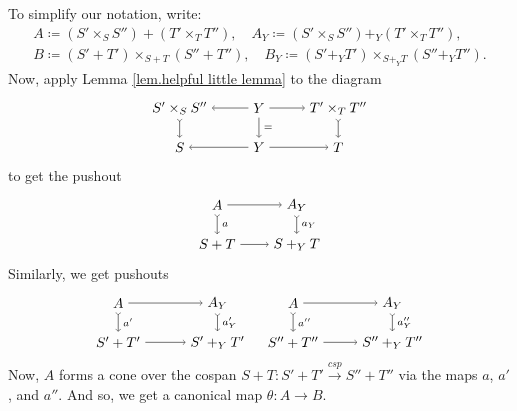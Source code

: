 \documentclass[11pt]{amsart}
\newcommand{\from}{\colon}
\newcommand{\cospan}{\xrightarrow{\mathit{csp}}}
\theoremstyle{remark}
\theoremstyle{definition}
\begin{document}
%
%
%
%
%

To simplify our notation, write:
%
\begin{gather*}
A \coloneqq (S' \times_SS'') + (T' \times_TT''), \quad 
A_Y \coloneqq (S' \times_SS'') +_Y (T' \times_TT''),\\
B \coloneqq (S'+T') \times_{S+T} (S''+T''),  \quad  
B_Y \coloneqq (S'+_YT') \times_{S+_YT} (S''+_YT''). 
\end{gather*}
Now, apply Lemma \ref{lem.helpful little lemma} to the diagram
\[
\begin{tikzpicture}[baseline=(current  bounding  box.center)]
	\node (B) at (-2,1) {$S'\times_SS''$};
	\node (A) at (0,1) {$Y$};
	\node (C) at (2,1) {$T'\times_TT''$};
	\node (B') at (-2,0) {$S$};
	\node (A') at (0,0) {$Y$};
	\node (C') at (2,0) {$T$};
	\draw [->] (A) edge (B);
	\draw [font=\scriptsize,->] (A) edge node[right] {$=$} (A');
	\draw [->] (A) edge (C);
	\draw [->] (A') edge (B');
	\draw [->] (A') edge (C');
	\draw [>->] (B) edge (B');
	\draw [>->] (C) edge (C');
\end{tikzpicture}
\]
to get the pushout
\[
\begin{tikzpicture}[baseline=(current  bounding  box.center)]
	\node (BC) at (0,1) {$A$};
	\node (BAC) at (2,1) {$A_Y$};
	\node (BC') at (0,0) {$S+T$};
	\node (BAC') at (2,0) {$S+_YT$};
	\draw [->] (BC) edge (BAC);
	\draw [font=\scriptsize,>->] (BC) edge node[right] {$a$} (BC');
	\draw [font=\scriptsize,>->] (BAC) edge node[right] {$a_Y$} (BAC');
	\draw [->] (BC') edge (BAC');
\end{tikzpicture}
\]
Similarly, we get pushouts
\[
\begin{tikzpicture}[baseline=(current  bounding  box.center)]
	\node (BC) at (0,1) {$A$};
	\node (BAC) at (2.5,1) {$A_Y$};
	\node (BC') at (0,0) {$S'+T'$};
	\node (BAC') at (2.5,0) {$S'+_YT'$};
	\draw [->] (BC) edge (BAC);
	\draw [font=\scriptsize,>->] (BC) edge node[right] {$a'$} (BC');
	\draw [font=\scriptsize,>->] (BAC) edge node[right] {$a'_Y$} (BAC');
	\draw [->] (BC') edge (BAC');
\end{tikzpicture}
\quad
\begin{tikzpicture}[baseline=(current  bounding  box.center)]
	\node (BC) at (0,1) {$A$};
	\node (BAC) at (2.5,1) {$A_Y$};
	\node (BC') at (0,0) {$S''+T''$};
	\node (BAC') at (2.5,0) {$S''+_YT''$};
	\draw [->] (BC) edge (BAC);
	\draw [font=\scriptsize,>->] (BC) edge node[right] {$a''$} (BC');
	\draw [font=\scriptsize,>->] (BAC) edge node[right] {$a''_Y$} (BAC');
	\draw [->] (BC') edge (BAC');
\end{tikzpicture}
\]
Now, $A$  forms a cone over the cospan $S+T \from S'+T' \cospan S'' + T''$ via the maps $a$, $a'$, and $a''$. And so, we get a canonical map $\theta \from A \to B$.  
%
%
%
%
%
%
\end{document}
